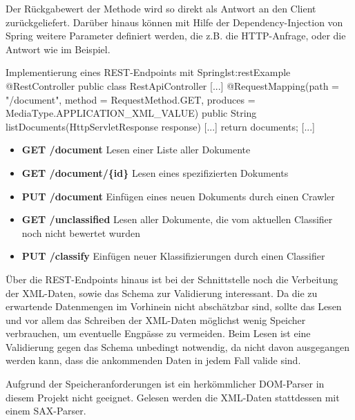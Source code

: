 Der Rückgabewert der Methode wird so direkt als Antwort an den Client zurückgeliefert.
Darüber hinaus können mit Hilfe der Dependency-Injection von Spring weitere Parameter
definiert werden, die z.B. die HTTP-Anfrage, oder die Antwort wie im Beispiel.
\vspace{1em}

\begin{java}{Implementierung eines REST-Endpoints mit Spring}{lst:restExample}
@RestController
public class RestApiController {
	[...]
	@RequestMapping(path = "/document", method = RequestMethod.GET, produces = MediaType.APPLICATION_XML_VALUE)
	public String listDocuments(HttpServletResponse response) {
		[...]
		return documents;
	}
	[...]
}
\end{java}

\begin{itemize}
	\item \textbf{GET /document}
	Lesen einer Liste aller Dokumente
	\item \textbf{GET /document/\{id\}}
	Lesen eines spezifizierten Dokuments
	\item \textbf{PUT /document}
	Einfügen eines neuen Dokuments durch einen Crawler
	\item \textbf{GET /unclassified}
	Lesen aller Dokumente, die vom aktuellen Classifier noch nicht bewertet wurden
	\item \textbf{PUT /classify}
	Einfügen neuer Klassifizierungen durch einen Classifier
\end{itemize}

Über die REST-Endpoints hinaus ist bei der Schnittstelle noch die Verbeitung der XML-Daten,
sowie das Schema zur Validierung interessant.
Da die zu erwartende Datenmengen im Vorhinein nicht abschätzbar sind,
sollte das Lesen und vor allem das Schreiben der XML-Daten möglichst wenig Speicher
verbrauchen, um eventuelle Engpässe zu vermeiden. Beim Lesen ist eine Validierung
gegen das Schema unbedingt notwendig, da nicht davon ausgegangen werden kann,
dass die ankommenden Daten in jedem Fall valide sind.

Aufgrund der Speicheranforderungen ist ein herkömmlicher DOM-Parser in diesem Projekt
nicht geeignet. Gelesen werden die XML-Daten stattdessen mit einem SAX-Parser.

